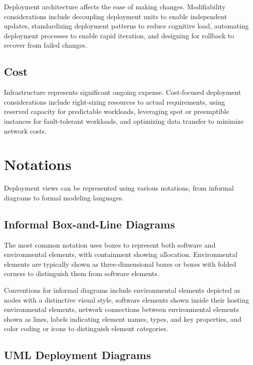 \documentclass[11pt]{article}
\begin{document}
Deployment architecture affects the ease of making changes. Modifiability considerations include decoupling deployment units to enable independent updates, standardizing deployment patterns to reduce cognitive load, automating deployment processes to enable rapid iteration, and designing for rollback to recover from failed changes.

\subsection{Cost}

Infrastructure represents significant ongoing expense. Cost-focused deployment considerations include right-sizing resources to actual requirements, using reserved capacity for predictable workloads, leveraging spot or preemptible instances for fault-tolerant workloads, and optimizing data transfer to minimize network costs.

\section{Notations}

Deployment views can be represented using various notations, from informal diagrams to formal modeling languages.

\subsection{Informal Box-and-Line Diagrams}

The most common notation uses boxes to represent both software and environmental elements, with containment showing allocation. Environmental elements are typically shown as three-dimensional boxes or boxes with folded corners to distinguish them from software elements.

Conventions for informal diagrams include environmental elements depicted as nodes with a distinctive visual style, software elements shown inside their hosting environmental elements, network connections between environmental elements shown as lines, labels indicating element names, types, and key properties, and color coding or icons to distinguish element categories.

\subsection{UML Deployment Diagrams}
\end{document}
